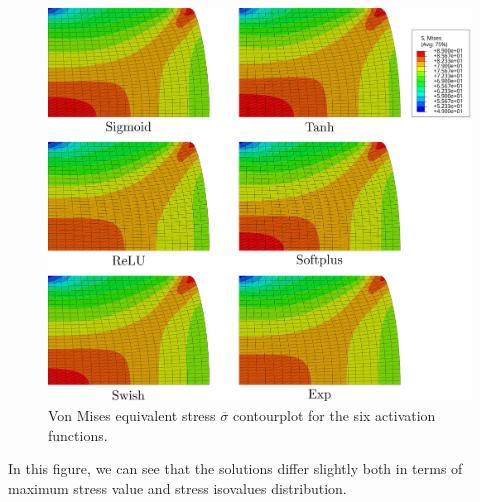 \documentclass[algorithms,article,submit,pdftex,oneauthors]{Definitions/mdpi}
\begin{document}
\begin{figure}[h!]
\centering
\includegraphics[width=0.9\columnwidth]{Figures/MisesHalf}
\caption{Von Mises equivalent stress $\overline{\sigma}$ contourplot for the six activation functions.}
\label{fig:Num-misesCP}
\end{figure}
In this figure, we can see that the solutions differ slightly both in terms of maximum stress value and stress isovalues distribution.
\end{document}
